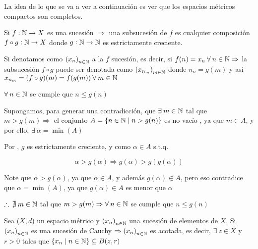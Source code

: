 \begin{remark}
    La idea de lo que se va a ver a continuación es ver que los espacios métricos compactos son completos.
\end{remark}

\begin{definition} \label{def415}
    Si $f : \mathbb{N} \to X$ es una sucesión $\Rightarrow$ una subsucesión de $f$ es cualquier composición $f \circ g : \mathbb{N} \to X$ donde $g : \mathbb{N} \to \mathbb{N}$ es estrictamente creciente.

    Si denotamos como ${\left( x_n\right)}_{n \in \mathbb{N}}$ a la $f$ sucesión, es decir, si $f(n) = x_n \: \forall \: n \in \mathbb{N} \Rightarrow$ la subsucesión $f \circ g$ puede ser denotada como ${\left( x_{n_m}\right)}_{m \in \mathbb{N}}$ donde $n_n = g(m)$ y así $x_{n_m} = (f \circ g)(m) = f(g(m)) \: \forall \: m \in \mathbb{N}$
\end{definition}

\begin{corollary}
    $\forall \: n \in \mathbb{N}$ se cumple que $n \leqslant g(n)$
\end{corollary}

\begin{orangeproof}
    Supongamos, para generar una contradicción, que $\exists \: m \in \mathbb{N}$ tal que $m > g(m) \Rightarrow$ el conjunto $A = \{ n \in \mathbb{N} \mid n > g(n) \}$ es no vacío , ya que $m \in A$, y por ello, $\exists \: \alpha = \min(A)$

    Por , $g$ es estrictamente creciente, y como $\alpha \in A$ s.t.q.

    $$\alpha > g(\alpha) \Rightarrow g(\alpha) > g(g(\alpha))$$

    Note que $\alpha > g(\alpha)$, ya que $\alpha \in A$, y además $g(\alpha) \in A$, pero eso contradice que $\alpha = \min(A)$, ya que $g(\alpha) \in A$ es menor que $\alpha$

    $\therefore \: \nexists  \: m \in \mathbb{N}$ tal que  $m > g(m) \Rightarrow \forall \: n \in \mathbb{N}$ se cumple que $n \leqslant g(n)$
\end{orangeproof}

\begin{theorem} \label{theom413}
    Sea ($X,d$) un espacio métrico y ${\left( x_n\right)}_{n \in \mathbb{N}}$ una sucesión de elementos de $X$. Si ${\left( x_n\right)}_{n \in \mathbb{N}}$ es una sucesión de Cauchy $\Rightarrow {\left( x_n\right)}_{n \in \mathbb{N}}$ es acotada, es decir, $\exists \: z \in X$ y $r > 0$ tales que $\{ x_n \mid n \in \mathbb{N} \} \subseteq B(z,r)$
\end{theorem}

